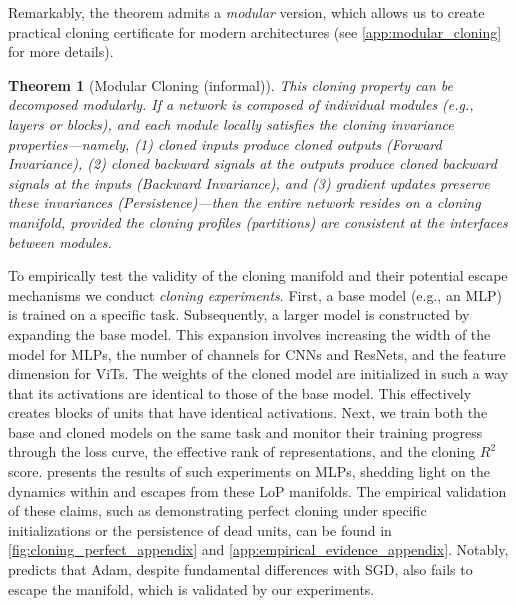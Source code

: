 \documentclass{article}
\newtheorem{theorem}{Theorem}[section]
\numberwithin{figure}{section}
\begin{document}
Remarkably, the theorem admits a \emph{modular} version, which  allows us to create practical cloning certificate for modern  architectures (see \cref{app:modular_cloning} for more details). 
\begin{theorem}[Modular Cloning (informal)]
\label{cor:modular_cloning}
This cloning property can be decomposed modularly. If a network is composed of individual modules (e.g., layers or blocks), and each module locally satisfies the cloning invariance properties—namely, (1) cloned inputs produce cloned outputs (Forward Invariance), (2) cloned backward signals at the outputs produce cloned backward signals at the inputs (Backward Invariance), and (3) gradient updates preserve these invariances (Persistence)—then the entire network resides on a cloning manifold, provided the cloning profiles (partitions) are consistent at the interfaces between modules.
\end{theorem}

To empirically test the validity of the cloning manifold and their potential escape mechanisms we conduct \emph{cloning experiments}. First, a base model (e.g., an MLP) is trained on a specific task. Subsequently, a larger model is constructed by expanding the base model. This expansion involves increasing the width of the model for MLPs, the number of channels for CNNs and ResNets, and the feature dimension for ViTs. The weights of the cloned model are initialized in such a way that its activations are identical to those of the base model. This effectively creates blocks of units that have identical activations. Next, we train both the base and cloned models on the same task and monitor their training progress through the loss curve, the effective rank of representations, and the cloning $R^2$ score.  presents the results of such experiments on MLPs, shedding light on the dynamics within and escapes from these LoP manifolds.
The empirical validation of these claims, such as demonstrating perfect cloning under specific initializations or the persistence of dead units, can be found in \cref{fig:cloning_perfect_appendix} and \cref{app:empirical_evidence_appendix}. Notably,  predicts that Adam, despite fundamental differences with SGD, also fails to escape the manifold, which is validated by our experiments. 
\end{document}
